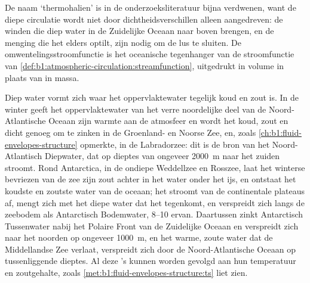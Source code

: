 De naam ‘thermohalien’ is in de onderzoeksliteratuur bijna verdwenen, want de diepe circulatie wordt niet door dichtheidsverschillen alleen aangedreven: de winden die diep water in de Zuidelijke Oceaan naar boven brengen, en de menging die het elders optilt, zijn nodig om de lus te sluiten. De omwentelingsstroomfunctie is het oceanische tegenhanger van de stroomfunctie van \cref{def:b1:atmospheric-circulation:streamfunction}, uitgedrukt in volume in plaats van in massa.

Diep water vormt zich waar het oppervlaktewater tegelijk koud en zout is. In de winter geeft het oppervlaktewater van het verre noordelijke deel van de Noord-Atlantische Oceaan zijn warmte aan de atmosfeer en wordt het koud, zout en dicht genoeg om te zinken in de Groenland- en Noorse Zee, en, zoals \cref{ch:b1:fluid-envelopes-structure} opmerkte, in de Labradorzee: dit is de bron van het Noord-Atlantisch Diepwater, dat op dieptes van ongeveer \qty{2000}{m} naar het zuiden stroomt. Rond Antarctica, in de ondiepe Weddellzee en Rosszee, laat het winterse bevriezen van de zee zijn zout achter in het water onder het ijs, en ontstaat het koudste en zoutste water van de oceaan; het stroomt van de continentale plateaus af, mengt zich met het diepe water dat het tegenkomt, en verspreidt zich langs de zeebodem als Antarctisch Bodemwater, \qtyrange{8}{10}{\sverdrup} ervan. Daartussen zinkt Antarctisch Tussenwater nabij het Polaire Front van de Zuidelijke Oceaan en verspreidt zich naar het noorden op ongeveer \qty{1000}{m}, en het warme, zoute water dat de Middellandse Zee verlaat, verspreidt zich door de Noord-Atlantische Oceaan op tussenliggende dieptes. Al deze 's kunnen worden gevolgd aan hun temperatuur en zoutgehalte, zoals \cref{met:b1:fluid-envelopes-structure:ts} liet zien.

